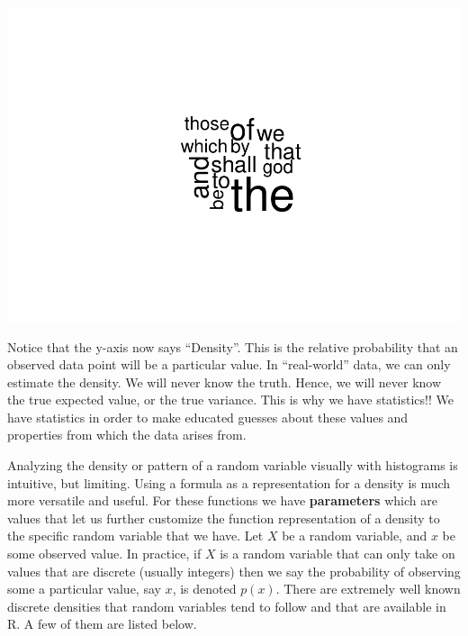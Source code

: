 \documentclass[
]{book}
\newenvironment{Shaded}{\begin{snugshade}}{\end{snugshade}}
\newcommand{\DataTypeTok}[1]{\textcolor[rgb]{0.13,0.29,0.53}{#1}}
\newcommand{\DecValTok}[1]{\textcolor[rgb]{0.00,0.00,0.81}{#1}}
\newcommand{\FloatTok}[1]{\textcolor[rgb]{0.00,0.00,0.81}{#1}}
\newcommand{\KeywordTok}[1]{\textcolor[rgb]{0.13,0.29,0.53}{\textbf{#1}}}
\newcommand{\NormalTok}[1]{#1}
\newcommand{\OperatorTok}[1]{\textcolor[rgb]{0.81,0.36,0.00}{\textbf{#1}}}
\newcommand{\OtherTok}[1]{\textcolor[rgb]{0.56,0.35,0.01}{#1}}
\newcommand{\StringTok}[1]{\textcolor[rgb]{0.31,0.60,0.02}{#1}}
\begin{document}
\begin{Shaded}
\end{Shaded}

\includegraphics{_main_files/figure-latex/unnamed-chunk-215-1.pdf}

Notice that the y-axis now says ``Density''. This is the relative probability that an observed data point will be a particular value. In ``real-world'' data, we can only estimate the density. We will never know the truth. Hence, we will never know the true expected value, or the true variance. This is why we have statistics!! We have statistics in order to make educated guesses about these values and properties from which the data arises from.

Analyzing the density or pattern of a random variable visually with histograms is intuitive, but limiting. Using a formula as a representation for a density is much more versatile and useful. For these functions we have \textbf{parameters} which are values that let us further customize the function representation of a density to the specific random variable that we have. Let \(X\) be a random variable, and \(x\) be some observed value. In practice, if \(X\) is a random variable that can only take on values that are discrete (usually integers) then we say the probability of observing some a particular value, say \(x\), is denoted \(p(x)\). There are extremely well known discrete densities that random variables tend to follow and that are available in R. A few of them are listed below.
\end{document}
